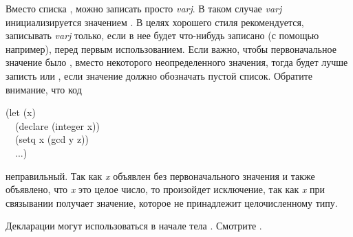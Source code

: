 \begin{defspec}
Вместо списка , можно записать просто
\emph{varj}. В таком случае \emph{varj} инициализируется значением {\false}.
В целях хорошего стиля рекомендуется, записывать \emph{varj} только, если в нее
будет что-нибудь записано (с помощью  например), перед первым
использованием. 
Если важно, чтобы первоначальное значение было {\false}, вместо некоторого
неопределенного значения,
тогда будет лучше записть  или , если значение должно обозначать пустой список. Обратите
внимание, что код
\begin{lisp}
(let (x) \\
~~(declare (integer x)) \\
~~(setq x (gcd y z)) \\
~~...)
\end{lisp}
неправильный. Так как \emph{x} объявлен без первоначального значения и также
объявлено, что \emph{x} это целое число, то произойдет исключение, так как
\emph{x} при связывании получает {\nil} значение, которое не принадлежит
целочисленному типу.

Декларации могут использоваться в начале тела . Смотрите .
\end{defspec}

